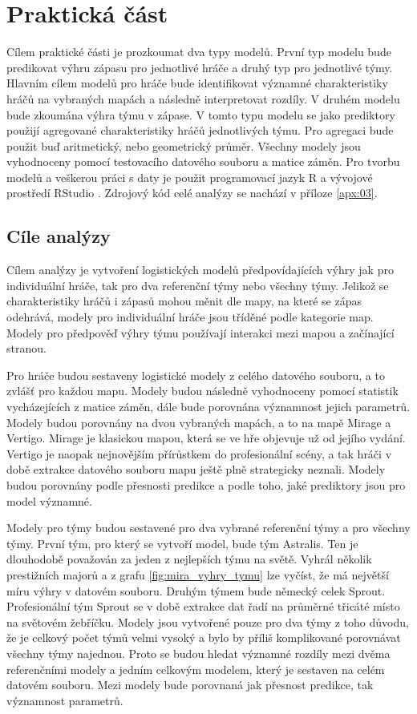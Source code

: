 \chapter{Praktická část}
Cílem praktické části je prozkoumat dva typy modelů. První typ modelu bude predikovat výhru zápasu pro jednotlivé hráče a druhý typ pro jednotlivé týmy. Hlavním cílem 
modelů pro hráče bude identifikovat významné charakteristiky hráčů na vybraných mapách a následně interpretovat rozdíly. V druhém modelu bude zkoumána výhra týmu v zápase.
V tomto typu modelu se jako prediktory použijí agregované charakteristiky hráčů jednotlivých týmu. Pro agregaci bude použit buď aritmetický, nebo geometrický průměr. Všechny
modely jsou vyhodnoceny pomocí testovacího datového souboru a matice záměn. Pro tvorbu modelů a veškerou práci s daty je použit programovací jazyk R \cite{team_r_2022}
a vývojové prostředí RStudio \cite{rstudio_rstudio_2022}. Zdrojový kód celé analýzy se nachází v příloze \ref{apx:03}.

\section{Cíle analýzy}
Cílem analýzy je vytvoření logistických modelů předpovídajících výhry jak pro individuální hráče, tak pro dva referenční týmy nebo všechny týmy. Jelikož se charakteristiky hráčů i 
zápasů mohou měnit dle mapy, na které se zápas odehrává, modely pro individuální hráče jsou tříděné podle kategorie map. Modely pro předpověď výhry týmu používají interakci
mezi mapou a začínající
stranou.

Pro hráče budou sestaveny logistické modely z celého datového souboru, a to zvlášť pro každou mapu. Modely budou následně vyhodnoceny pomocí statistik vycházejících
z matice záměn, dále bude porovnána významnost jejich parametrů. Modely budou porovnány na dvou vybraných mapách, a to na mapě Mirage a Vertigo. Mirage je klasickou mapou, která
se ve hře objevuje už od jejího vydání. Vertigo je naopak nejnovějším přírůstkem do profesionální scény, a tak hráči v době extrakce datového souboru mapu ještě plně strategicky 
neznali. Modely budou porovnány podle přesnosti predikce a podle toho, jaké prediktory jsou pro model významné.

Modely pro týmy budou sestavené pro dva vybrané referenční týmy a pro všechny týmy. První tým, pro který se vytvoří model, bude tým Astralis.
Ten je dlouhodobě považován za jeden z nejlepších týmu na světě. Vyhrál několik prestižních majorů a z grafu \ref{fig:mira_vyhry_tymu} lze vyčíst, že má největší míru výhry v
datovém souboru. Druhým týmem bude německý celek Sprout. Profesionální tým Sprout se v době extrakce dat řadí na průměrné třicáté místo na světovém žebříčku.
Modely jsou vytvořené pouze pro dva týmy z toho důvodu, že je celkový počet týmů velmi vysoký a bylo by příliš komplikované porovnávat všechny týmy najednou. Proto se budou
hledat významné rozdíly mezi dvěma referenčními modely a jedním celkovým modelem, který je sestaven na celém datovém souboru. Mezi modely bude porovnaná jak přesnost predikce,
tak významnost parametrů. 

